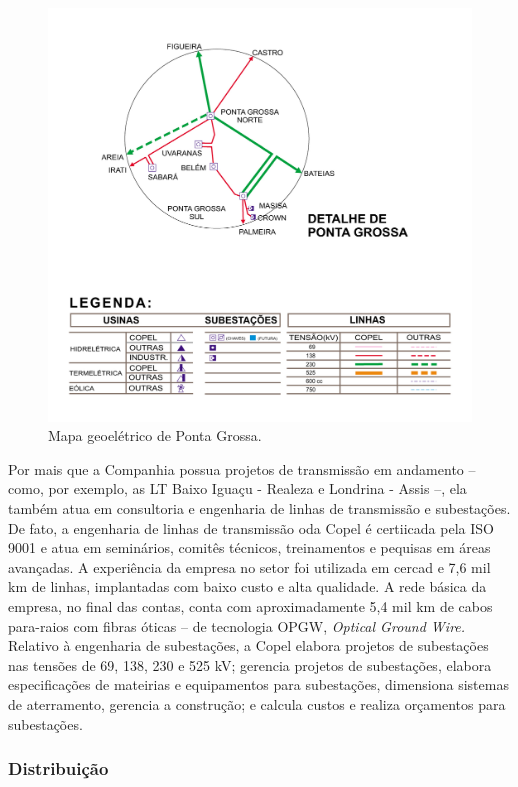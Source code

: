 \documentclass[grad,numbers]{coppe}
\begin{document}
  \begin{figure}[H]
  \includegraphics[width=1\linewidth]{img/mapa_geoeletrico_ponta_grossa} \caption{Mapa geoelétrico de Ponta Grossa.}\label{fig:unnamed-chunk-9}
  \end{figure}
  Por mais que a Companhia possua projetos de transmissão em andamento -- como, por exemplo, as LT Baixo Iguaçu - Realeza e Londrina - Assis --, ela também atua em consultoria e engenharia de linhas de transmissão e subestações. De fato, a engenharia de linhas de transmissão oda Copel é certiicada pela ISO 9001 e atua em seminários, comitês técnicos, treinamentos e pequisas em áreas avançadas. A experiência da empresa no setor foi utilizada em cercad e 7,6 mil km de linhas, implantadas com baixo custo e alta qualidade. A rede básica da empresa, no final das contas, conta com aproximadamente 5,4 mil km de cabos para-raios com fibras óticas -- de tecnologia OPGW, \emph{Optical Ground Wire.} Relativo à engenharia de subestações, a Copel elabora projetos de subestações nas tensões de 69, 138, 230 e 525 kV; gerencia projetos de subestações, elabora especificações de mateirias e equipamentos para subestações, dimensiona sistemas de aterramento, gerencia a construção; e calcula custos e realiza orçamentos para subestações.

  \hypertarget{distribuiuxe7uxe3o}{%
  \subsubsection{Distribuição}\label{distribuiuxe7uxe3o}}
\end{document}

